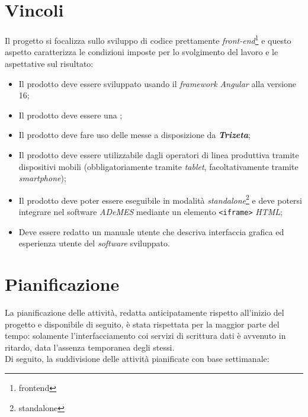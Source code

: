 \section{Vincoli}

Il progetto si focalizza sullo sviluppo di codice prettamente \textit{front-end}\footnote{\gls{frontend}} e questo aspetto caratterizza le condizioni imposte per lo svolgimento del lavoro e le aspettative sul risultato:
\begin{itemize}
    \item Il prodotto deve essere sviluppato usando il \textit{framework Angular} alla versione 16;
    \item Il prodotto deve essere una ;
    \item Il prodotto deve fare uso delle  messe a disposizione da \textit{\textbf{Trizeta}};
    \item Il prodotto deve essere utilizzabile dagli operatori di linea produttiva tramite dispositivi mobili (obbligatoriamente tramite \textit{tablet}, facoltativamente tramite \textit{smartphone});
    \item Il prodotto deve poter essere eseguibile in modalità \textit{standalone}\footnote{\gls{standalone}} e deve potersi integrare nel software \textit{ADeMES} mediante un elemento \texttt{<iframe>} \textit{HTML};
    \item Deve essere redatto un manuale utente che  descriva interfaccia grafica ed esperienza utente del \textit{software} sviluppato.
\end{itemize}

\section{Pianificazione}
La pianificazione delle attività, redatta anticipatamente rispetto all'inizio del progetto e disponibile di seguito, è stata rispettata per la maggior parte del tempo: solamente l'interfacciamento coi servizi 
di scrittura dati è avvenuto in ritardo, data l'assenza temporanea degli stessi. \\
Di seguito, la suddivisione delle attività pianificate con base settimanale:

